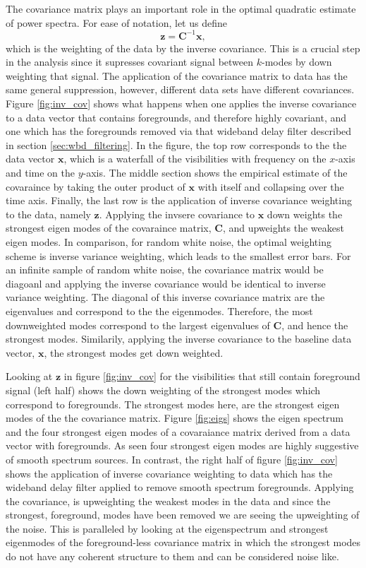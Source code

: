 \documentclass[twocolumn,numberedappendix]{emulateapj} \shorttitle{PSA64}
\newcommand{\x}{\mathbf{x}} \newcommand{\xhat}{\hat{\mathbf{x}}}
\newcommand{\C}{\mathbf{C}} \newcommand{\Q}{\mathbf{Q}}
\begin{document}
The covariance matrix plays an important role in the optimal quadratic estimate
of power spectra. For ease of notation, let us define 
\begin{equation}\label{eqn:z}
    \mathbf{z} =  \mathbf{C}^{-1}\mathbf{x},
\end{equation}
which is the weighting of the data by the inverse covariance. This is a crucial
step in the analysis since it supresses covariant signal between $k$-modes by
down weighting that signal. The application of the covariance matrix to data has
the same general suppression, however, different data sets have different
covariances. Figure  \ref{fig:inv_cov} shows what happens when one applies the
inverse covariance to a data vector that contains foregrounds, and therefore
highly covariant,  and one which has the foregrounds removed via that wideband
delay filter described in section \ref{sec:wbd_filtering}.  In the figure, the
top row corresponds to the the data vector $\mathbf{x}$, which is a waterfall of
the visibilities with frequency on the $x$-axis and time on the $y$-axis. The
middle section shows the empirical estimate of the covaraince by taking the
outer product of $\x$ with itself and collapsing over the time axis. Finally,
the last row is the application of inverse covariance weighting to the data,
namely $\mathbf{z}$.  Applying the invsere covariance to $\x$ down weights the
strongest eigen modes of the covaraince matrix, $\mathbf{C}$, and upweights the
weakest eigen modes. In comparison, for random white noise, the optimal
weighting scheme is inverse variance weighting, which leads to the smallest
error bars. For an infinite sample of random white noise, the covariance matrix
would be diagoanl and applying the inverse covariance would be identical to
inverse variance weighting. The diagonal of this inverse covariance matrix are
the eigenvalues and correspond to the the eigenmodes. Therefore, the most
downweighted modes correspond to the largest eigenvalues of $\C$, and hence the
strongest modes.  Similarily, applying the inverse covariance to the baseline
data vector, $\x$, the strongest modes get down weighted. 

Looking at $\mathbf{z}$ in figure \ref{fig:inv_cov} for the visibilities that
still contain foreground signal (left half) shows the down weighting of
the strongest modes which correspond to foregrounds. The strongest modes here,
are the strongest eigen modes of the the covariance matrix. Figure
\ref{fig:eigs} shows the eigen spectrum and the four strongest eigen modes of a
covaraiance matrix derived from a data vector with foregrounds. As seen four
strongest eigen modes are highly suggestive of smooth spectrum sources. In
contrast, the right half of figure \ref{fig:inv_cov} shows the application of
inverse covariance weighting to data which has the wideband delay filter applied
to remove smooth spectrum foregrounds. Applying the covariance, is upweighting
the weakest modes in the data and since the strongest, foreground, modes have
been removed we are seeing the upweighting of the noise. This is paralleled by
looking at the eigenspectrum and strongest eigenmodes of the foreground-less
covariance matrix in which the strongest modes do not have any coherent
structure to them and can be considered noise like.
\end{document}

